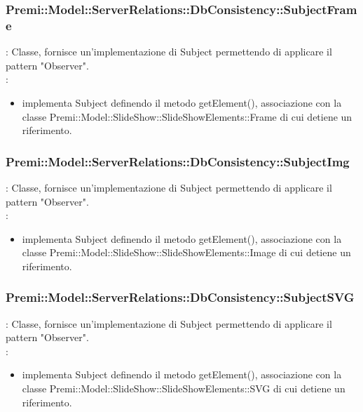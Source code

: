 {            \subsubsection{Premi::Model::ServerRelations::DbConsistency::SubjectFrame}{
				\textbf{\tipo}: Classe, fornisce un’implementazione di Subject permettendo di applicare il pattern "Observer".\\	
				\textbf{\relaz}: 
				\begin{itemize}
					\item implementa Subject definendo il metodo getElement(), associazione con la classe Premi::Model::SlideShow::SlideShowElements::Frame di cui detiene un riferimento.
				\end{itemize}	
            }
            
            \subsubsection{Premi::Model::ServerRelations::DbConsistency::SubjectImg}{
				\textbf{\tipo}: Classe, fornisce un’implementazione di Subject permettendo di applicare il pattern "Observer".\\	
				\textbf{\relaz}: 
				\begin{itemize}
					\item implementa Subject definendo il metodo getElement(), associazione con la classe Premi::Model::SlideShow::SlideShowElements::Image di cui detiene un riferimento.
				\end{itemize}	
            }
            
            \subsubsection{Premi::Model::ServerRelations::DbConsistency::SubjectSVG}{
				\textbf{\tipo}: Classe, fornisce un’implementazione di Subject permettendo di applicare il pattern "Observer".\\	
				\textbf{\relaz}: 
				\begin{itemize}
					\item implementa Subject definendo il metodo getElement(), associazione con la classe Premi::Model::SlideShow::SlideShowElements::SVG di cui detiene un riferimento.
				\end{itemize}	
            }
            
        }


	